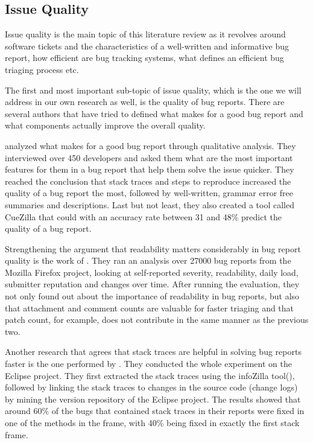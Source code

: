 \documentclass{mprop}
\begin{document}
\subsection{Issue Quality}\label{issue_quality}

Issue quality is the main topic of this literature review as it revolves around
software tickets and the characteristics of a well-written and 
informative bug report, how efficient are bug tracking systems, what defines
an efficient bug triaging process etc. 

The first and most important sub-topic of issue quality, which is the one
we will address in our own research as well, is the quality of bug reports.
There are several authors that have tried to defined what makes for a good bug
report and what components actually improve the overall quality.

\citet{bettenburg2008makes} analyzed what 
makes for a good bug report through qualitative analysis. They interviewed over
450 developers and asked them what are the most important features for them in
a bug report that help them solve the issue quicker. They reached the conclusion 
that stack traces and steps to reproduce increased the quality of a bug report 
the most, followed by well-written, grammar error free summaries and 
descriptions. Last but not least, they also created a tool called CueZilla that 
could with an accuracy rate between 31 and 48\% predict the quality of a bug 
report. 

Strengthening the argument that readability matters considerably in bug report 
quality is the work of \citet{hooimeijer2007modeling}. They ran an analysis over
27000 bug reports from the Mozilla Firefox project, looking at self-reported 
severity, readability, daily load, submitter reputation and changes over time. 
After running the evaluation, they not only found out about the importance of
readability in bug reports, but also that attachment and comment counts are 
valuable for faster triaging and that patch count, for example, does not
contribute in the same manner as the previous two.

Another research that agrees that stack traces are helpful in solving bug
reports faster is the one performed by \citet{schroter2010stack}. They conducted
the whole experiment on the Eclipse project. They first extracted the stack
traces using the infoZilla tool(\citep{bettenburg2008extracting}), followed by
linking the stack traces to changes in the source code (change logs) by mining
the version repository of the Eclipse project. The results showed that 
around 60\% of the bugs that contained stack traces in their reports were fixed
in one of the methods in the frame, with 40\% being fixed in exactly the first
stack frame.
\end{document}
